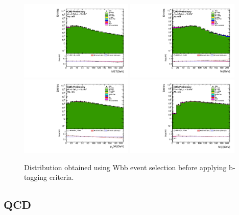 \begin{figure}[htbp]
	\centering
		\includegraphics[width=0.48\textwidth]{Figures/Results/noBtag/Wbb_GetMET_doQCD1.pdf}
		\includegraphics[width=0.48\textwidth]{Figures/Results/noBtag/Wbb_GetVMt_doQCD1.pdf}
		\includegraphics[width=0.48\textwidth]{Figures/Results/noBtag/Wbb_GetWpt_doQCD1.pdf}
		\includegraphics[width=0.48\textwidth]{Figures/Results/noBtag/Wbb_H_mass_doQCD1.pdf}		
	\caption[Distribution obtained using Wbb event selection before applying b-tagging criteria.]{Distribution obtained using Wbb event selection before applying b-tagging criteria.}
	\label{fig:Wjets}
\end{figure}

\subsection{QCD}
\label{sec:QCD}

